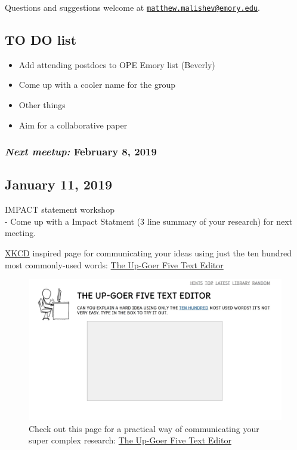 \documentclass[10,portrait]{article}
\providecommand{\tightlist}{%
  \setlength{\itemsep}{0pt}\setlength{\parskip}{0pt}}
\begin{document}
Questions and suggestions welcome at
\href{mailto:matthew.malishev@emory.edu}{\nolinkurl{matthew.malishev@emory.edu}}.

\newpage  

\subsection{TO DO list}\label{to-do-list}

\begin{itemize}
\tightlist
\item
  Add attending postdocs to OPE Emory list (Beverly)\\
\item
  Come up with a cooler name for the group\\
\item
  Other things\\
\item
  Aim for a collaborative paper
\end{itemize}

\subsubsection{\texorpdfstring{\emph{Next meetup:} February 8,
2019}{Next meetup: February 8, 2019}}\label{next-meetup-february-8-2019}

\newpage    

\subsection{January 11, 2019}\label{january-11-2019}

IMPACT statement workshop\\
- Come up with a Impact Statment (3 line summary of your research) for
next meeting.

\href{https://xkcd.com/}{XKCD} inspired page for communicating your
ideas using just the ten hundred most commonly-used words:
\href{http://splasho.com/upgoer5/}{The Up-Goer Five Text Editor}

\begin{figure}
\centering
\includegraphics{upgoer5.jpeg}
\caption{Check out this page for a practical way of communicating your
super complex research: \href{http://splasho.com/upgoer5/}{The Up-Goer
Five Text Editor}}
\end{figure}
\end{document}
